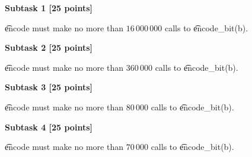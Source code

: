{\bf Subtask 1 [25 points]}

\t{encode} must make no more than $16\,000\,000$ calls to \t{encode\_bit(b)}.

{\bf Subtask 2 [25 points]}

\t{encode} must make no more than $360\,000$ calls to \t{encode\_bit(b)}.

{\bf Subtask 3 [25 points]}

\t{encode} must make no more than $80\,000$ calls to \t{encode\_bit(b)}.

{\bf Subtask 4 [25 points]}

\t{encode} must make no more than $70\,000$ calls to \t{encode\_bit(b)}.

